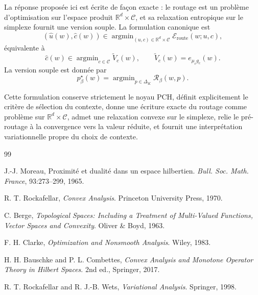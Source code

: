 \documentclass[11pt,a4paper]{article}
\DeclareMathOperator{\argmin}{argmin}
\newcommand{\R}{\mathbb R}
\newcommand{\Ccal}{\mathcal C}
\newcommand{\Rcal}{\mathcal R}
\begin{document}
La réponse proposée ici est écrite de façon exacte : le routage est un problème d'optimisation sur l'espace produit \(\R^d\times\Ccal\), et sa relaxation entropique sur le simplexe fournit une version souple. La formulation canonique est
\[
(\hat u(w),\hat c(w))\in\argmin_{(u,c)\in\R^d\times\Ccal}\mathcal E_{\mathrm{route}}(w;u,c),
\]
équivalente à
\[
\hat c(w)\in\argmin_{c\in\Ccal}\widetilde V_c(w),
\qquad
\widetilde V_c(w)=e_{\mu_c g_c}(w).
\]
La version souple est donnée par
\[
p^\star_\beta(w)=\argmin_{p\in\Delta_K}\Rcal_\beta(w,p).
\]

Cette formulation conserve strictement le noyau PCH, définit explicitement le critère de sélection du contexte, donne une écriture exacte du routage comme problème sur \(\R^d\times\Ccal\), admet une relaxation convexe sur le simplexe, relie le pré-routage à la convergence vers la valeur réduite, et fournit une interprétation variationnelle propre du choix de contexte.

\begin{thebibliography}{99}

J.-J. Moreau,
\newblock Proximité et dualité dans un espace hilbertien.
\newblock \emph{Bull. Soc. Math. France}, 93:273--299, 1965.

R. T. Rockafellar,
\newblock \emph{Convex Analysis}.
\newblock Princeton University Press, 1970.

C. Berge,
\newblock \emph{Topological Spaces: Including a Treatment of Multi-Valued Functions, Vector Spaces and Convexity}.
\newblock Oliver \& Boyd, 1963.

F. H. Clarke,
\newblock \emph{Optimization and Nonsmooth Analysis}.
\newblock Wiley, 1983.

H. H. Bauschke and P. L. Combettes,
\newblock \emph{Convex Analysis and Monotone Operator Theory in Hilbert Spaces}.
\newblock 2nd ed., Springer, 2017.

R. T. Rockafellar and R. J.-B. Wets,
\newblock \emph{Variational Analysis}.
\newblock Springer, 1998.

\end{thebibliography}
\end{document}

